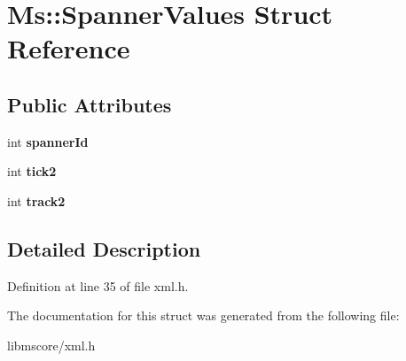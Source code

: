 \hypertarget{struct_ms_1_1_spanner_values}{}\section{Ms\+:\+:Spanner\+Values Struct Reference}
\label{struct_ms_1_1_spanner_values}
\subsection*{Public Attributes}
\begin{DoxyCompactItemize}
\item 
\mbox{\label{struct_ms_1_1_spanner_values_acab8553badff6b662c088ea14ac12a65}} 
int {\bfseries spanner\+Id}
\item 
\mbox{\label{struct_ms_1_1_spanner_values_a1bd8e02dce880603fa6adc168836ebbf}} 
int {\bfseries tick2}
\item 
\mbox{\label{struct_ms_1_1_spanner_values_ab017e64796d4ed2b4153df568cdc4789}} 
int {\bfseries track2}
\end{DoxyCompactItemize}


\subsection{Detailed Description}


Definition at line 35 of file xml.\+h.



The documentation for this struct was generated from the following file\+:\begin{DoxyCompactItemize}
\item 
libmscore/xml.\+h\end{DoxyCompactItemize}
